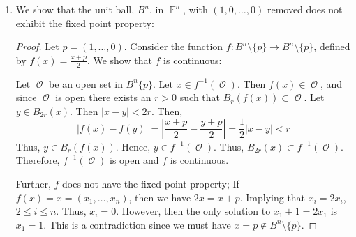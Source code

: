 \documentclass{book}
\DeclareMathOperator*{\E}{\mathbb{E}}
\DeclareMathOperator*{\Ocal}{\mathcal{O}}
\begin{document}
\begin{enumerate}[(1)]
    \item We show that the unit ball, $B^n$, in $\E^n$, with $(1,0,\dots,0)$ removed does not exhibit the fixed point property: 
        \begin{proof} Let $p=(1,\dots,0)$. Consider the function $f:B^n\setminus \{p\} \rightarrow B^n\setminus \{p\}$, defined by $f(x) = \frac{x+p}{2}$. We show that $f$ is continuous: 
            \par Let ${\Ocal}$ be an open set in $B^n\{p\}$. Let $x \in f^{-1}({\Ocal})$. Then $f(x) \in {\Ocal}$, and since ${\Ocal}$ is open there exists an $r>0$ such that $B_r(f(x))\subset {\Ocal}$. Let $y\in B_{2r}(x)$. Then $|x-y|<2r$. Then, 
            $$|f(x)-f(y)|=|\frac{x+p}{2}-\frac{y+p}{2}|=\frac{1}{2}|x-y|<r$$
            Thus, $y\in B_r(f(x))$. Hence, $y\in f^{-1}({\Ocal})$. Thus, $B_{2r}(x)\subset f^{-1}({\Ocal})$. Therefore, $f^{-1}({\Ocal})$ is open and $f$ is continuous.
            \par Further, $f$ does not have the fixed-point property; If $f(x) = x = (x_1,\dots, x_n)$, then we have $2x = x+p$. Implying that $x_i = 2x_i$, $2 \leq i \leq n$. Thus, $x_i = 0$. However, then the only solution to $x_1 + 1 = 2x_1$ is $x_1 = 1$. This is a contradiction since we must have $x = p \notin B^n\setminus\{p\}$. 
        \end{proof}


\end{enumerate}
\end{document}
